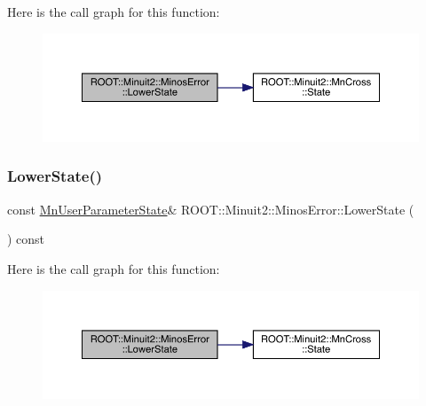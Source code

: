 Here is the call graph for this function\+:
\nopagebreak
\begin{figure}[H]
\begin{center}
\leavevmode
\includegraphics[width=350pt]{d2/dd1/classROOT_1_1Minuit2_1_1MinosError_ac10a407a1cb13f4e0c1b4d21383d15df_cgraph}
\end{center}
\end{figure}
\mbox{\label{classROOT_1_1Minuit2_1_1MinosError_ac10a407a1cb13f4e0c1b4d21383d15df}} 
\subsubsection{\texorpdfstring{LowerState()}{LowerState()}\hspace{0.1cm}{\footnotesize\ttfamily [2/3]}}
{\footnotesize\ttfamily const \mbox{\hyperlink{classROOT_1_1Minuit2_1_1MnUserParameterState}{Mn\+User\+Parameter\+State}}\& R\+O\+O\+T\+::\+Minuit2\+::\+Minos\+Error\+::\+Lower\+State (\begin{DoxyParamCaption}{ }\end{DoxyParamCaption}) const\hspace{0.3cm}{\ttfamily [inline]}}

Here is the call graph for this function\+:
\nopagebreak
\begin{figure}[H]
\begin{center}
\leavevmode
\includegraphics[width=350pt]{d2/dd1/classROOT_1_1Minuit2_1_1MinosError_ac10a407a1cb13f4e0c1b4d21383d15df_cgraph}
\end{center}
\end{figure}
\mbox{\label{classROOT_1_1Minuit2_1_1MinosError_ac10a407a1cb13f4e0c1b4d21383d15df}} 
